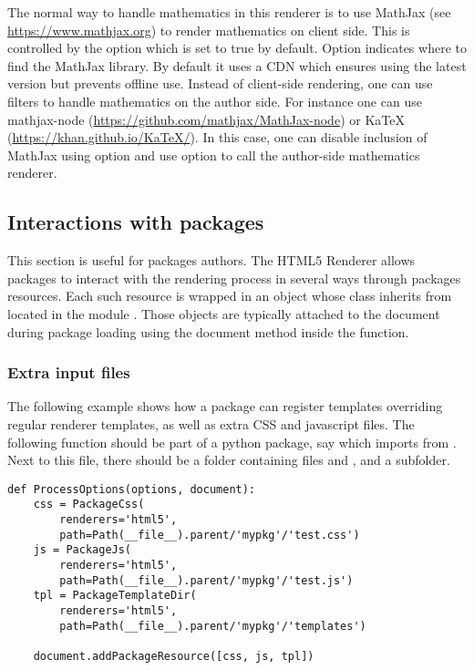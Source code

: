 The normal way to handle mathematics in this renderer is to use MathJax
(see \url{https://www.mathjax.org}) to render mathematics on client side.
This is controlled by the  option which is
set to true by default. Option  indicates
where to find the MathJax library. By default it uses a CDN which
ensures using the latest version but prevents offline use.
Instead of client-side rendering, one can use filters to handle
mathematics on the author side. For instance one can use mathjax-node
(\url{https://github.com/mathjax/MathJax-node}) or KaTeX
(\url{https://khan.github.io/KaTeX/}). In this case, one can disable
inclusion of MathJax using option  and
use option  to call the author-side
mathematics renderer.

\subsection{Interactions with packages}\label{sec:html5-pkg}

This section is useful for packages authors. The HTML5 Renderer allows
packages to interact with the rendering process in several ways through
packages resources. Each such resource is wrapped in an object whose
class inherits from  located in the module
. Those objects are typically attached to
the document during package loading using the document
 method inside the 
function.

\subsubsection*{Extra input files}

The following example shows how a package can register templates
overriding regular renderer templates, as well as extra CSS and
javascript files.
The following function should be part of a python package, say
 which imports  from .
Next to this file, there should be a
folder  containing files  and ,
and a  subfolder.

\begin{verbatim}
def ProcessOptions(options, document):
    css = PackageCss(
        renderers='html5',
        path=Path(__file__).parent/'mypkg'/'test.css')
    js = PackageJs(
        renderers='html5',
        path=Path(__file__).parent/'mypkg'/'test.js')
    tpl = PackageTemplateDir(
        renderers='html5',
        path=Path(__file__).parent/'mypkg'/'templates')

    document.addPackageResource([css, js, tpl])
\end{verbatim}

